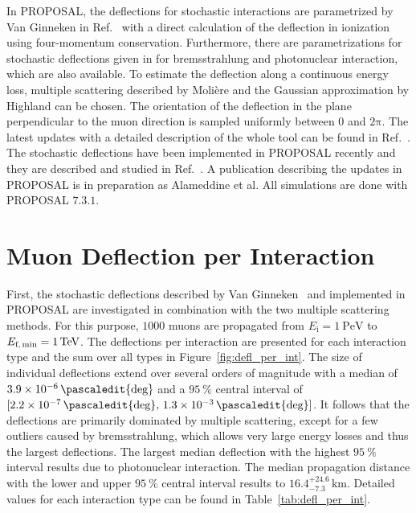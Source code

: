 In PROPOSAL, the deflections for stochastic interactions are parametrized by Van Ginneken 
in Ref.~\cite{Van_Ginneken} with a direct calculation of the deflection in 
ionization using four-momentum conservation. 
Furthermore, there are parametrizations for stochastic deflections given in   
for bremsstrahlung and photonuclear interaction, which 
are also available.
To estimate the deflection along 
a continuous energy loss, multiple scattering described by Molière 
 \cite{moliere_scattering} and the Gaussian approximation by 
Highland 
can be chosen. 
The orientation of the deflection in the plane perpendicular to the muon direction is 
sampled uniformly between $0$ and $2\mathrm{\pi}$.
The latest updates with a detailed description of the whole tool can be found 
in Ref.~\cite{phd_soedingrekso}. 
The stochastic deflections have been implemented in PROPOSAL recently and they are 
described and studied in Ref.~\cite{Gutjahr_2021}.
A publication describing the 
updates in PROPOSAL is in preparation as Alameddine et al.
All simulations are done with PROPOSAL $7.3.1$.

\section{Muon Deflection per Interaction}\label{sec:defl_per_int}
First, the stochastic deflections described by Van Ginneken~\cite{Van_Ginneken} 
and implemented 
in PROPOSAL are investigated in combination with the two multiple scattering methods. 
For this purpose, $\num{1000}$ muons are propagated from $E_{\text{i}} = \SI{1}{\peta\electronvolt}$ to $E_{\text{f,\,min}} = \SI{1}{\tera\electronvolt}$.
The deflections per interaction are presented 
for each interaction type and the sum over all types in Figure~\ref{fig:defl_per_int}. 
The size of individual deflections 
extend over several orders of magnitude with a median of $\num{3.9e-6}\,\pascaledit{\text{deg}}$
and a $\SI{95}{\percent}$ central interval of $[\num{2.2e-7}\,\pascaledit{\text{deg}}, \,\num{1.3e-3}\,\pascaledit{\text{deg}}]$. 
It follows that the deflections are primarily dominated by multiple scattering, except for a few outliers caused by bremsstrahlung, which 
allows very large energy losses and thus the largest deflections. 
The largest median deflection with the highest $\SI{95}{\percent}$ interval results due to photonuclear interaction.
The median propagation distance with the lower and upper $\SI{95}{\percent}$ 
central interval results to $16.4_{-7.3}^{+24.6}\,\si{\kilo\meter}$.
Detailed values for each interaction type can be found in Table~\ref{tab:defl_per_int}.

